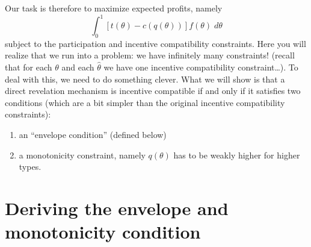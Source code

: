 \documentclass[12pt]{article}
\begin{document}
Our task is therefore to maximize expected profits, namely
$$\int_0^1 [t(\theta )-c(q(\theta ))]f(\theta )\;d\theta $$
subject to the participation and incentive compatibility constraints. Here you will realize that we run into a problem: we have infinitely many constraints! (recall that for each $\theta $ and each $\hat{\theta }$ we have one incentive compatibility constraint\dots). To deal with this, we need to do something clever. What we will show is that a direct revelation mechanism is incentive compatible if and only if it satisfies two conditions (which are a bit simpler than the original incentive compatibility constraints):
\begin{enumerate}
\item an ``envelope condition'' (defined below)
  \item a monotonicity constraint, namely $q(\theta )$ has to be weakly higher for higher types.
\end{enumerate}

\section{Deriving the envelope and monotonicity condition}
\end{document}
